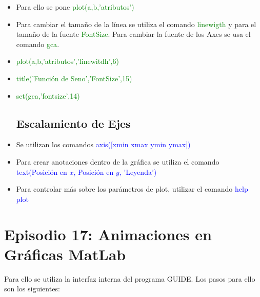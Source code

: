 \documentclass{article}
\begin{document}
\begin{itemize}
	\item Para ello se pone \textcolor{green}{plot(a,b,'atributos')}
	
	\item Para cambiar el tamaño de la línea se utiliza el comando \textcolor{green}{linewigth} y para el tamaño de la fuente \textcolor{green}{FontSize}. Para cambiar la fuente de los Axes se usa el comando \textcolor{green}{gca}.
	
	\item \textcolor{green}{plot(a,b,'atributos','linewitdh',6)}
	
	\item \textcolor{green}{title('Función de Seno','FontSize',15)}
	
	\item \textcolor{green}{set(gca,'fontsize',14)}
	\subsection{Escalamiento de Ejes}
	
	\item Se utilizan los comandos \textcolor{blue}{axis([xmin xmax ymin ymax])}
	
	\item Para crear anotaciones dentro de la gráfica se utiliza el comando \textcolor{blue}{text(Posición en $x$, Posición en $y$, 'Leyenda')}
	
	\item Para controlar más sobre los parámetros de plot, utilizar el comando \textcolor{blue}{help plot}
	
	\end{itemize}


	\section{Episodio 17: Animaciones en Gráficas MatLab}
	
	Para ello se utiliza la interfaz interna del programa GUIDE. Los pasos para ello son los siguientes:
	
\end{document}
